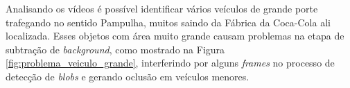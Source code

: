 

Analisando os vídeos é possível identificar vários veículos de grande porte trafegando no sentido Pampulha, muitos saindo da Fábrica da Coca-Cola ali localizada. Esses objetos com área muito grande causam problemas na etapa de subtração de \textit{background}, como mostrado na Figura \ref{fig:problema_veiculo_grande}, interferindo por alguns \textit{frames} no processo de detecção de \textit{blobs} e gerando oclusão em veículos menores. 


